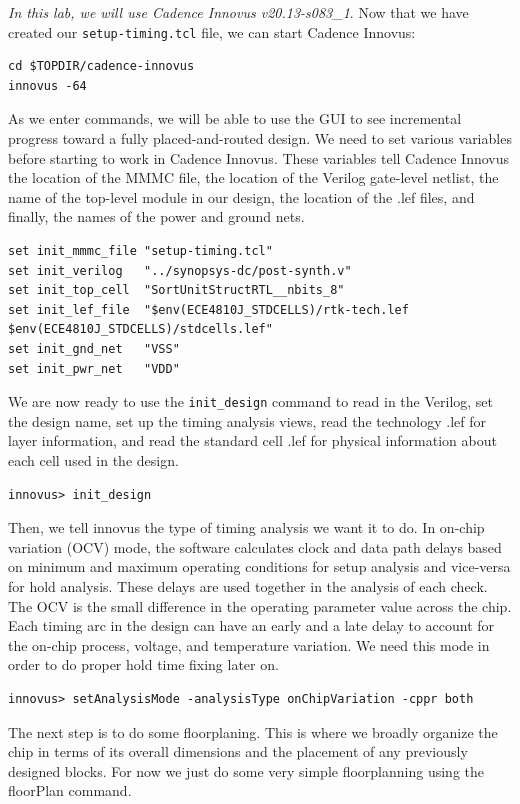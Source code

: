 \documentclass[a4paper,12pt,twoside]{article}
\begin{document}
\textit{In this lab, we will use Cadence Innovus v20.13-s083\_1}. Now that we have created our \texttt{setup-timing.tcl} file, we can start Cadence Innovus:
\begin{verbatim}
cd $TOPDIR/cadence-innovus
innovus -64
\end{verbatim}
As we enter commands, we will be able to use the GUI to see incremental progress toward a fully placed-and-routed design. We need to set various variables before starting to work in Cadence Innovus. These variables tell Cadence Innovus the location of the MMMC file, the location of the Verilog gate-level netlist, the name of the top-level module in our design, the location of the .lef files, and finally, the names of the power and ground nets.
\begin{verbatim}
set init_mmmc_file "setup-timing.tcl"
set init_verilog   "../synopsys-dc/post-synth.v"
set init_top_cell  "SortUnitStructRTL__nbits_8"
set init_lef_file  "$env(ECE4810J_STDCELLS)/rtk-tech.lef $env(ECE4810J_STDCELLS)/stdcells.lef"
set init_gnd_net   "VSS"
set init_pwr_net   "VDD"
\end{verbatim}
We are now ready to use the \texttt{init\_design} command to read in the Verilog, set the design name, set up the timing analysis views, read the technology .lef for layer information, and read the standard cell .lef for physical information about each cell used in the design.
\begin{verbatim}
innovus> init_design
\end{verbatim}
Then, we tell innovus the type of timing analysis we want it to do. In on-chip variation (OCV) mode, the software calculates clock and data path delays based on minimum and maximum operating conditions for setup analysis and vice-versa for hold analysis. These delays are used together in the analysis of each check. The OCV is the small difference in the operating parameter value across the chip. Each timing arc in the design can have an early and a late delay to account for the on-chip process, voltage, and temperature variation. We need this mode in order to do proper hold time fixing later on.
\begin{verbatim}
innovus> setAnalysisMode -analysisType onChipVariation -cppr both
\end{verbatim}
The next step is to do some floorplaning. This is where we broadly organize the chip in terms of its overall dimensions and the placement of any previously designed blocks. For now we just do some very simple floorplanning using the floorPlan command.
\end{document}
